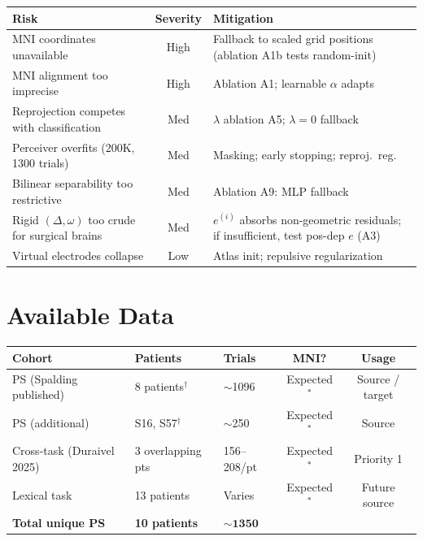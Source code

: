 \documentclass[11pt,letterpaper]{article}
\begin{document}
\begin{table}[ht!]\centering\small
\begin{tabular}{@{}p{}cp{}@{}}
\toprule
\textbf{Risk} & \textbf{Severity} & \textbf{Mitigation} \\
\midrule
MNI coordinates unavailable & High & Fallback to scaled grid positions (ablation A1b tests random-init) \\
MNI alignment too imprecise & High & Ablation A1; learnable $\alpha$ adapts \\
Reprojection competes with classification & Med & $\lambda$ ablation A5; $\lambda{=}0$ fallback \\
Perceiver overfits (200K, 1300 trials) & Med & Masking; early stopping; reproj.\ reg. \\
Bilinear separability too restrictive & Med & Ablation A9: MLP fallback \\
Rigid $(\Delta,\omega)$ too crude for surgical brains & Med & $e^{(i)}$ absorbs non-geometric residuals; if insufficient, test pos-dep $e$ (A3) \\
Virtual electrodes collapse & Low & Atlas init; repulsive regularization \\
\bottomrule
\end{tabular}
\end{table}



\section{Available Data}\label{sec:data}

\begin{table}[ht!]\centering\small
\begin{tabular}{@{}lllcc@{}}
\toprule
\textbf{Cohort} & \textbf{Patients} & \textbf{Trials} & \textbf{MNI?} & \textbf{Usage} \\
\midrule
PS (Spalding published) & 8 patients$^\dagger$ & ${\sim}$1096 & Expected$^*$ & Source / target \\
PS (additional) & S16, S57$^\dagger$ & ${\sim}$250 & Expected$^*$ & Source \\
Cross-task (Duraivel 2025) & 3 overlapping pts & 156--208/pt & Expected$^*$ & Priority 1 \\
Lexical task & 13 patients & Varies & Expected$^*$ & Future source \\
\midrule
\textbf{Total unique PS} & \textbf{10 patients} & $\mathbf{{\sim}1350}$ & & \\
\bottomrule
\end{tabular}
\end{table}
\end{document}
